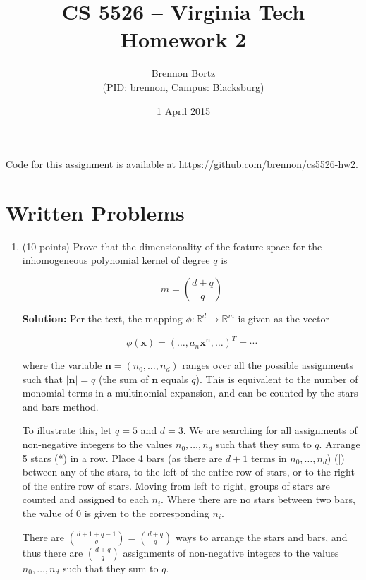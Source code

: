\documentclass[11pt]{article}
\begin{document}
\title{CS 5526 -- Virginia Tech\\
	Homework 2}
\author{Brennon Bortz \\ (PID: brennon, Campus: Blacksburg)}
\date{1 April 2015}
\maketitle

Code for this assignment is available at \url{https://github.com/brennon/cs5526-hw2}.

\section*{Written Problems}

\begin{enumerate}

\item (10 points) Prove that the dimensionality of the feature space for the inhomogeneous polynomial kernel of degree $q$ is

\begin{equation}
m = \binom{d+q}{q} \nonumber
\end{equation}

\textbf{Solution:} Per the text, the mapping $\phi : \mathbb{R}^d \rightarrow \mathbb{R}^m$ is given as the vector

\begin{equation}
\phi(\mathbf{x}) = (\ldots , a_n \mathbf{x}^\mathbf{n} , \ldots)^\mathit{T} = \cdots \nonumber
\end{equation}

where the variable $\mathbf{n}=(n_0,\ldots,n_d)$ ranges over all the possible assignments such that $|\mathbf{n}|=q$ (the sum of $\mathbf{n}$ equals $q$). This is equivalent to the number of monomial terms in a multinomial expansion, and can be counted by the stars and bars method.

To illustrate this, let $q = 5$ and $d = 3$. We are searching for all assignments of non-negative integers to the values $n_0,\ldots,n_d$ such that they sum to $q$. Arrange 5 stars (*) in a row. Place 4 bars (as there are $d + 1$ terms in $n_0,\ldots,n_d$) (|) between any of the stars, to the left of the entire row of stars, or to the right of the entire row of stars. Moving from left to right, groups of stars are counted and assigned to each $n_i$. Where there are no stars between two bars, the value of 0 is given to the corresponding $n_i$.

There are $\binom{d+1+q-1}{q} = \binom{d+q}{q}$ ways to arrange the stars and bars, and thus there are $\binom{d+q}{q}$ assignments of non-negative integers to the values $n_0,\ldots,n_d$ such that they sum to $q$.


\end{enumerate}
\end{document}

